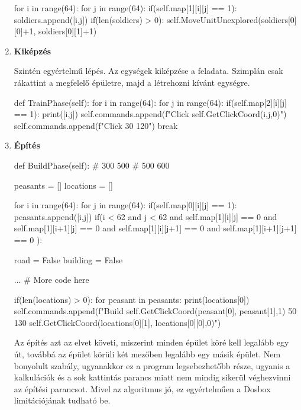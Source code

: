 \begin{enumerate}
\begin{python}
    for i in range(64):
        for j in range(64):
            if(self.map[1][i][j] == 1):
                soldiers.append([i,j])
    if(len(soldiers) > 0):
        self.MoveUnitUnexplored(soldiers[0][0]+1,
        soldiers[0][1]+1)
    \end{python}

    \item \textbf{Kiképzés}
    
Szintén egyértelmű lépés. Az egységek kiképzése a feladata. Szimplán csak rákattint a megfelelő épületre, majd a létrehozni kívánt egységre.
    \begin{python}
def TrainPhase(self):
    for i in range(64):
        for j in range(64):
            if(self.map[2][i][j] == 1):
                print([i,j])
                self.commands.append(f"Click 
                        {self.GetClickCoord(i,j,0)}")
                self.commands.append(f"Click 30 120")
                break
    \end{python}

    \item \textbf{Építés}
    
    \begin{python}
def BuildPhase(self):
# 300 500
# 500 600

peasants = []
locations = []

for i in range(64):
    for j in range(64):
        if(self.map[0][i][j] == 1):
            peasants.append([i,j])
        if(i < 62 and j < 62 and self.map[1][i][j] == 0 and 
        self.map[1][i+1][j] == 0 and 
        self.map[1][i][j+1] == 0 and 
        self.map[1][i+1][j+1] == 0 ):
                    
            road = False
            building = False

            ... # More code here
           
if(len(locations) > 0):
    for peasant in peasants:
            print(locations[0])
            self.commands.append(f"Build 
            {self.GetClickCoord(peasant[0],
            peasant[1],1)} 50 130 
            {self.GetClickCoord(locations[0][1],
            locations[0][0],0)}")

    \end{python}

    Az építés azt az elvet követi, miszerint minden épület köré kell legalább egy út, továbbá az épület körüli két mezőben legalább egy másik épület. Nem bonyolult szabály, ugyanakkor ez a program legsebezhetőbb része, ugyanis a kalkulációk és a sok kattintás parancs miatt nem mindig sikerül véghezvinni az építési parancsot. Mivel az algoritmus jó, ez egyértelműen a Dosbox limitációjának tudható be.


\end{enumerate}
